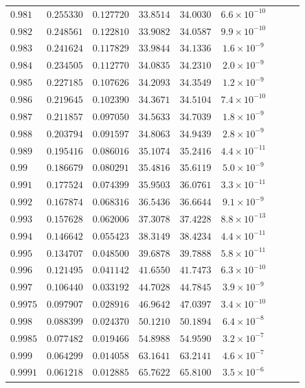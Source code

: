 \documentclass[12pt]{extarticle}
\theoremstyle{plain}
\theoremstyle{remark}
\begin{document}
\begin{longtable}{lcccccccc}
$0.981$ & $0.255330$ & $0.127720$ & $33.8514$ & $34.0030$ & $6.6\times10^{-10}$ \\
$0.982$ & $0.248561$ & $0.122810$ & $33.9082$ & $34.0587$ & $9.9\times10^{-10}$ \\
$0.983$ & $0.241624$ & $0.117829$ & $33.9844$ & $34.1336$ & $1.6\times10^{-9}$ \\
$0.984$ & $0.234505$ & $0.112770$ & $34.0835$ & $34.2310$ & $2.0\times10^{-9}$ \\
$0.985$ & $0.227185$ & $0.107626$ & $34.2093$ & $34.3549$ & $1.2\times10^{-9}$ \\
$0.986$ & $0.219645$ & $0.102390$ & $34.3671$ & $34.5104$ & $7.4\times10^{-10}$ \\
$0.987$ & $0.211857$ & $0.097050$ & $34.5633$ & $34.7039$ & $1.8\times10^{-9}$ \\
$0.988$ & $0.203794$ & $0.091597$ & $34.8063$ & $34.9439$ & $2.8\times10^{-9}$ \\
$0.989$ & $0.195416$ & $0.086016$ & $35.1074$ & $35.2416$ & $4.4\times10^{-11}$ \\
$0.99$ & $0.186679$ & $0.080291$ & $35.4816$ & $35.6119$ & $5.0\times10^{-9}$ \\
$0.991$ & $0.177524$ & $0.074399$ & $35.9503$ & $36.0761$ & $3.3\times10^{-11}$ \\
$0.992$ & $0.167874$ & $0.068316$ & $36.5436$ & $36.6644$ & $9.1\times10^{-9}$ \\
$0.993$ & $0.157628$ & $0.062006$ & $37.3078$ & $37.4228$ & $8.8\times10^{-13}$ \\
$0.994$ & $0.146642$ & $0.055423$ & $38.3149$ & $38.4234$ & $4.4\times10^{-11}$ \\
$0.995$ & $0.134707$ & $0.048500$ & $39.6878$ & $39.7888$ & $5.8\times10^{-11}$ \\
$0.996$ & $0.121495$ & $0.041142$ & $41.6550$ & $41.7473$ & $6.3\times10^{-10}$ \\
$0.997$ & $0.106440$ & $0.033192$ & $44.7028$ & $44.7845$ & $3.9\times10^{-9}$ \\
$0.9975$ & $0.097907$ & $0.028916$ & $46.9642$ & $47.0397$ & $3.4\times10^{-10}$ \\
$0.998$ & $0.088399$ & $0.024370$ & $50.1210$ & $50.1894$ & $6.4\times10^{-8}$ \\
$0.9985$ & $0.077482$ & $0.019466$ & $54.8988$ & $54.9590$ & $3.2\times10^{-7}$ \\
$0.999$ & $0.064299$ & $0.014058$ & $63.1641$ & $63.2141$ & $4.6\times10^{-7}$ \\
$0.9991$ & $0.061218$ & $0.012885$ & $65.7622$ & $65.8100$ & $3.5\times10^{-6}$ \\

\end{longtable}
\end{document}
